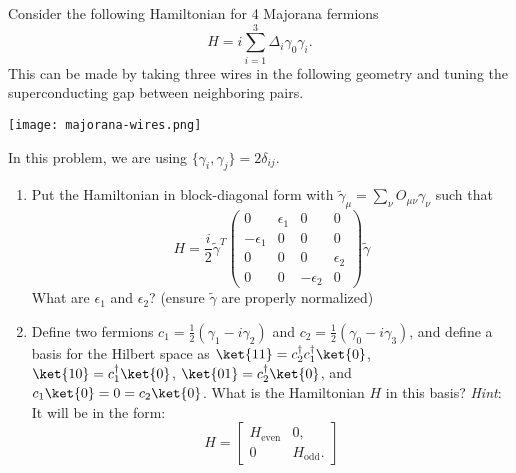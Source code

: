\documentclass{jhwhw}
\begin{document}

Consider the following Hamiltonian for 4 Majorana fermions
\begin{equation}
  \label{eq:9}
  H = i \sum_{i=1}^{3} \Delta_{i} \gamma_{0} \gamma_{i}.
\end{equation}
This can be made by taking three wires in the following geometry and tuning the superconducting gap between neighboring pairs.

\begin{center}
\texttt{[image: majorana-wires.png]}
\end{center}

In this problem, we are using $\{\gamma_{i}, \gamma_{j}\} = 2 \delta_{ij}$.

\begin{enumerate}
  \item Put the Hamiltonian in block-diagonal form with $\tilde \gamma_{\mu} = \sum_{\nu} O_{\mu\nu} \gamma_{\nu}$ such that
        \begin{equation}
          \label{eq:11}
          H = \frac{i}2 \tilde \gamma^{T}
          \begin{pmatrix}
            0 & \epsilon_{1} & 0 & 0 \\
            -\epsilon_{1} & 0 & 0 & 0 \\
            0 & 0 & 0 & \epsilon_{2}  \\
            0 & 0 & -\epsilon_{2} & 0
          \end{pmatrix} \tilde \gamma
        \end{equation}
        What are $\epsilon_{1}$ and $\epsilon_{2}$? (ensure $\tilde \gamma$ are properly normalized)
  \item Define two fermions $c_{1} = \frac12 (\gamma_1 - i \gamma_{2})$ and $c_{2} = \frac12(\gamma_{0} - i \gamma_{3})$, and define a basis for the Hilbert space as $\ket{11} = c_{2}^{\dagger} c_{1}^{\dagger} \ket{0}$, $\ket{10} = c_{1}^{\dagger}\ket{0}$, $\ket{01} = c_{2}^{\dagger} \ket{0}$, and $c_{1} \ket{0} = 0 = c_{2} \ket{0}$. What is the Hamiltonian $H$ in this basis? \emph{Hint}: It will be in the form:
        \begin{equation}
          \label{eq:12}
          H =
          \begin{bmatrix}
            H_{\mathrm{even}} & 0, \\
            0 & H_{\mathrm{odd}}.
          \end{bmatrix}
        \end{equation}

\end{enumerate}
\end{document}
